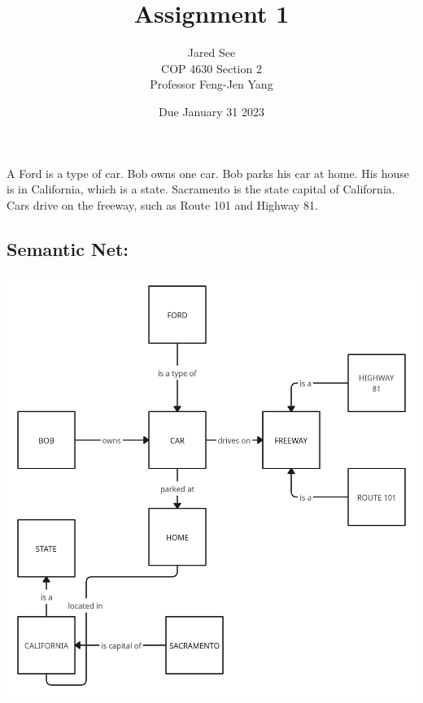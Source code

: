 \documentclass[titlepage]{article}
\title{Assignment 1}
\author{Jared See\\COP 4630 Section 2\\Professor Feng-Jen Yang}
\date{Due January 31 2023}
\begin{document}
\maketitle
{
    A Ford is a type of car. Bob owns one car. Bob parks his car at home. His house is in California, which is a state. Sacramento is the state capital of California. Cars drive on the freeway, such as Route 101 and Highway 81.
}

\subsection*{Semantic Net:}
{
    \begin{center}
        \includegraphics[scale=.2]{net.png}
    \end{center}
}
\end{document}
